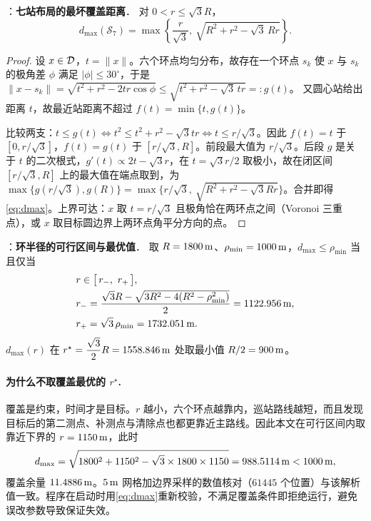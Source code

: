 \begin{theorem}：\textbf{七站布局的最坏覆盖距离}．\label{thm:hexcover}
对 $0<r\le\sqrt3R$，
\begin{equation}\label{eq:dmax}
  d_{\max}(\mathcal S_7)=\max\left\{\frac{r}{\sqrt3},\ \sqrt{R^2+r^2-\sqrt3\,Rr}\right\}.
\end{equation}
\end{theorem}
\begin{proof}
设 $x\in\mathcal{D}$，$t=\|x\|$。六个环点均匀分布，故存在一个环点 $s_k$ 使 $x$ 与 $s_k$ 的极角差 $\phi$ 满足 $|\phi|\le30^\circ$，于是
$\|x-s_k\|=\sqrt{t^2+r^2-2tr\cos\phi}\le\sqrt{t^2+r^2-\sqrt3\,tr}=:g(t)$。
又圆心站给出距离 $t$，故最近站距离不超过 $f(t)=\min\{t,g(t)\}$。

比较两支：$t\le g(t)\iff t^2\le t^2+r^2-\sqrt3tr\iff t\le r/\sqrt3$。因此
$f(t)=t$ 于 $[0,r/\sqrt3]$，$f(t)=g(t)$ 于 $[r/\sqrt3,R]$。前段最大值为 $r/\sqrt3$。后段 $g$ 是关于 $t$ 的二次根式，$g'(t)\propto2t-\sqrt3r$，在 $t=\sqrt3r/2$ 取极小，故在闭区间 $[r/\sqrt3,R]$ 上的最大值在端点取到，为 $\max\{g(r/\sqrt3),g(R)\}=\max\{r/\sqrt3,\ \sqrt{R^2+r^2-\sqrt3Rr}\}$。合并即得\cref{eq:dmax}。上界可达：$x$ 取 $t=r/\sqrt3$ 且极角恰在两环点之间（Voronoi 三重点），或 $x$ 取目标圆边界上两环点角平分方向的点。
\end{proof}

\begin{corollary}：\textbf{环半径的可行区间与最优值}．\label{cor:ring}
取 $R=1800\,\mathrm{m}$、$\rho_{\min}=1000\,\mathrm{m}$，$d_{\max}\le\rho_{\min}$ 当且仅当
\begin{equation}\label{eq:ringrange}
  \begin{aligned}
  &r\in\bigl[\,r_-,\ r_+\,\bigr],\\
  &r_-=\frac{\sqrt3R-\sqrt{3R^2-4(R^2-\rho_{\min}^2)}}{2}=1122.956\,\mathrm{m},\\
  &r_+=\sqrt3\,\rho_{\min}=1732.051\,\mathrm{m} .
  \end{aligned}
\end{equation}
$d_{\max}(r)$ 在 $r^\star=\dfrac{\sqrt3}{2}R=1558.846\,\mathrm{m}$ 处取最小值 $R/2=900\,\mathrm{m}$。
\end{corollary}

\paragraph{为什么不取覆盖最优的 $r^\star$.} 覆盖是约束，时间才是目标。$r$ 越小，六个环点越靠内，巡站路线越短，而且发现目标后的第二测点、补测点与清除点也都更靠近主路线。因此本文在可行区间内取靠近下界的 $r=1150\,\mathrm{m}$，此时
\begin{equation}
  d_{\max}=\sqrt{1800^2+1150^2-\sqrt3\times1800\times1150}=988.5114\,\mathrm{m}<1000\,\mathrm{m},
\end{equation}
覆盖余量 $11.4886\,\mathrm{m}$。$5\,\mathrm{m}$ 网格加边界采样的数值核对（$61445$ 个位置）与该解析值一致。程序在启动时用\cref{eq:dmax}重新校验，不满足覆盖条件即拒绝运行，避免误改参数导致保证失效。

